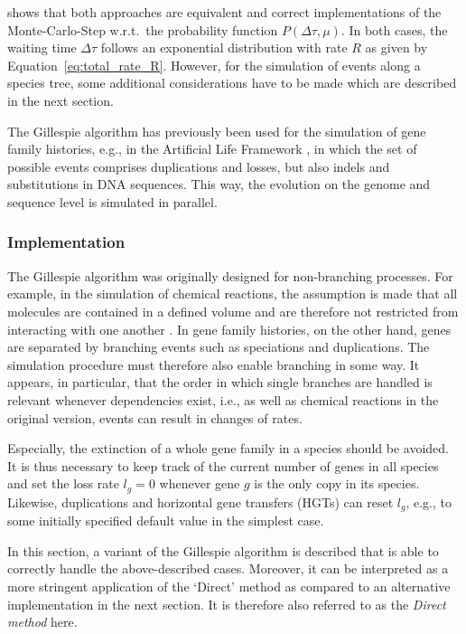 \documentclass[hidelinks,11pt]{scrreprt}
\begin{document}
\citet{gillespie1976} shows that both approaches are equivalent and correct implementations of the Monte-Carlo-Step w.r.t.\ the probability function $P(\Delta\tau,\mu)$. In both cases, the waiting time $\Delta\tau$ follows an exponential distribution with rate $R$ as given by Equation~\ref{eq:total_rate_R}.
However, for the simulation of events along a species tree, some additional considerations have to be made which are described in the next section.

The Gillespie algorithm has previously been used for the simulation of gene family histories, e.g., in the Artificial Life Framework \citep[\texttt{ALF},][]{dalquen2012}, in which the set of possible events comprises duplications and losses, but also indels and substitutions in DNA sequences. This way, the evolution on the genome and sequence level is simulated in parallel.

\subsubsection{Implementation}

The Gillespie algorithm was originally designed for non-branching processes. For example, in the simulation of chemical reactions, the assumption is made that all molecules are contained in a defined volume and are therefore not restricted from interacting with one another \citep{gillespie1977}.
In gene family histories, on the other hand, genes are separated by branching events such as speciations and duplications. The simulation procedure must therefore also enable branching in some way. It appears, in particular, that the order in which single branches are handled is relevant whenever dependencies exist, i.e., as well as chemical reactions in the original version, events can result in changes of rates.

Especially, the extinction of a whole gene family in a species should be avoided. It is thus necessary to keep track of the current number of genes in all species and set the loss rate $l_g=0$ whenever gene $g$ is the only copy in its species. Likewise, duplications and horizontal gene transfers (HGTs) can reset $l_g$, e.g., to some initially specified default value in the simplest case.

In this section, a variant of the Gillespie algorithm is described that is able to correctly handle the above-described cases. Moreover, it can be interpreted as a more stringent application of the `Direct' method as compared to an alternative implementation in the next section. It is therefore also referred to as the \emph{Direct method} here.
\end{document}
